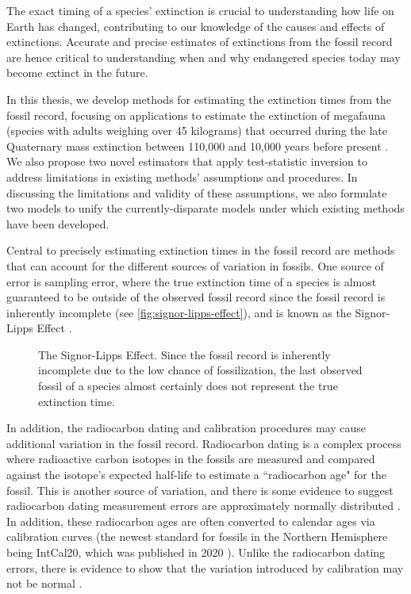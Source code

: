 
The exact timing of a species' extinction is crucial to understanding how life on Earth has changed, contributing to our knowledge of the causes and effects of extinctions. Accurate and precise estimates of extinctions from the fossil record are hence critical to understanding when and why endangered species today may become extinct in the future.

In this thesis, we develop methods for estimating the extinction times from the fossil record, focusing on applications to estimate the extinction of megafauna (species with adults weighing over 45 kilograms) that occurred during the late Quaternary mass extinction between 110,000 and 10,000 years before present \cite{Walker2005Quaternary}. We also propose two novel estimators that apply test-statistic inversion to address limitations in existing methods' assumptions and procedures. In discussing the limitations and validity of these assumptions, we also formulate two models to unify the currently-disparate models under which existing methods have been developed.

Central to precisely estimating extinction times in the fossil record are methods that can account for the different sources of variation in fossils. One source of error is sampling error, where the true extinction time of a species is almost guaranteed to be outside of the observed fossil record since the fossil record is inherently incomplete (see \autoref{fig:signor-lipps-effect}), and is known as the Signor-Lipps Effect \cite{Signor1982}.
\begin{figure}[ht]
    \centering
    
    \caption{The Signor-Lipps Effect. Since the fossil record is inherently incomplete due to the low chance of fossilization, the last observed fossil of a species almost certainly does not represent the true extinction time.}
    \label{fig:signor-lipps-effect}
\end{figure}

In addition, the radiocarbon dating and calibration procedures may cause additional variation in the fossil record. Radiocarbon dating is a complex process where radioactive carbon isotopes in the fossils are measured and compared against the isotope's expected half-life to estimate a ``radiocarbon age" for the fossil. This is another source of variation, and there is some evidence to suggest radiocarbon dating measurement errors are approximately normally distributed \cite{Taylor1987,Walker2005Quaternary}. In addition, these radiocarbon ages are often converted to calendar ages via calibration curves (the newest standard for fossils in the Northern Hemisphere being IntCal20, which was published in 2020 \cite{Reimer2020}). Unlike the radiocarbon dating errors, there is evidence to show that the variation introduced by calibration may not be normal \cite{Ramsey2009, Ramsey2010, Ramsey2013}.

